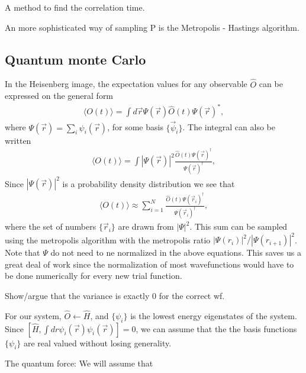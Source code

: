 \documentclass[a4paper,10pt,twocolumn]{article} %
\newcommand{\expec}[1]{\langle{}{#1}\rangle{}}
\begin{document}
A method to find the correlation time.


An more sophisticated way of sampling P is the Metropolis - Hastings algorithm.

\subsection{Quantum monte Carlo}%

In the Heisenberg image, the expectation values for any observable $\hat O$ can be expressed on the general form
\begin{align}
	\expec{ O(t) } = \int d\vec r \Psi(\vec r) \hat O(t) \Psi(\vec r)^*,
\end{align}
where $\Psi(\vec r) = \sum_i \psi_i(\vec r)$, for some basis $\{ \vec \psi_i \}$. 
The integral can also be written 
\begin{align}
	\expec{ O(t) } = \int |\Psi(\vec r)|^2 \frac{ \hat O(t) \Psi(\vec r)^\dagger } {\Psi(\vec r)^\dagger},
\end{align}
Since $|\Psi(\vec r)|^2$ is a probability density distribution we see that
\begin{align}
	\expec{ O(t) } \approx \sum_{i=1}^N \frac{ \hat O(t) \Psi(\vec r_i)^\dagger } {\Psi(\vec r_i)^\dagger}, \label{RFQMC1} 
\end{align}
%
where the set of numbers $\{\vec r_i\}$ are drawn from $|\Psi|^2$.
This sum can be sampled using the metropolis algorithm with the metropolis ratio $|\Psi(r_i)|^2/|\Psi(r_{i+1})|^2$.
%
Note that $\Psi$ do not need to ne normalized in the above equations. This saves us a great deal of work since the normalization 
of most wavefunctions would have to be done numerically for every new trial function.%

Show/argue that the variance is exactly 0 for the correct wf.

For our system, $\hat O\gets\hat H$, and $\{ \psi_i \}$ is the lowest energy eigenstates of the system. 
Since $[\hat H , \int dr \psi_i(\vec r)\psi_i(\vec r)]=0$, we can
assume that the the basis functions $\{ \psi_i \}$ are real valued without losing generality.

The quantum force:
We will assume that 






\section{}%



\tableofcontents
\end{document}

